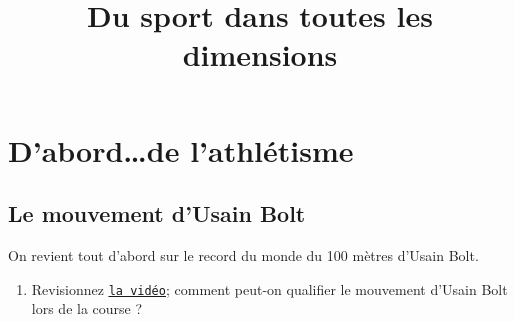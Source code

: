 \documentclass[12pt]{article}
\title{Du sport dans toutes les dimensions}\author{}\date{}
\begin{document}
\maketitle
\thispagestyle{fancy}

\section{D'abord\ldots de l'athlétisme}

\subsection{Le mouvement d'Usain Bolt}
On revient tout d'abord sur le record du monde du 100 mètres d'Usain Bolt.

\begin{enumerate}
\item \rco Revisionnez \href{https://github.com/formationPythonPC/formation20-21/tree/master/activites-2nde/3-tp-sports/Bolt2.avi}{\underline{\texttt{la vidéo}}}; comment peut-on qualifier le mouvement d'Usain Bolt lors de la course ?
\end{enumerate}
\end{document}
